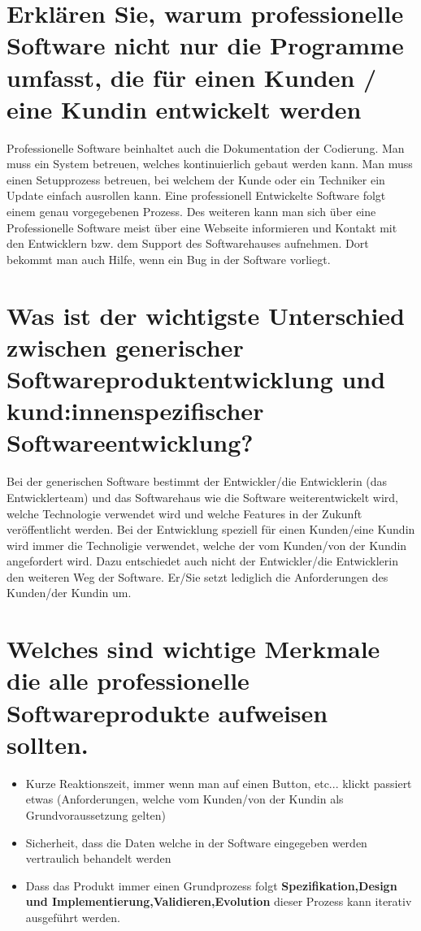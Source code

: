 \documentclass[12pt]{article}
\begin{document}
\section{Erklären Sie, warum professionelle Software nicht nur die Programme umfasst, die für einen Kunden / eine
Kundin entwickelt werden}
Professionelle Software beinhaltet auch die Dokumentation der Codierung. Man muss ein System betreuen, welches kontinuierlich gebaut werden kann. Man muss einen Setupprozess betreuen, bei welchem der Kunde oder ein Techniker ein Update einfach ausrollen kann. Eine professionell Entwickelte Software folgt einem genau vorgegebenen Prozess. Des weiteren kann man sich über eine Professionelle Software meist über eine Webseite informieren und Kontakt mit den Entwicklern bzw. dem Support des Softwarehauses aufnehmen. Dort bekommt man auch Hilfe, wenn ein Bug in der Software vorliegt.

\section{Was ist der wichtigste Unterschied zwischen generischer Softwareproduktentwicklung und
kund:innenspezifischer Softwareentwicklung?}
Bei der generischen Software bestimmt der Entwickler/die Entwicklerin (das Entwicklerteam) und das Softwarehaus wie die Software weiterentwickelt wird, welche Technologie verwendet wird und welche Features in der Zukunft veröffentlicht werden.
Bei der Entwicklung speziell für einen Kunden/eine Kundin wird immer die Technoligie verwendet, welche der vom Kunden/von der Kundin angefordert wird. Dazu entschiedet auch nicht der Entwickler/die Entwicklerin den weiteren Weg der Software. Er/Sie setzt lediglich die Anforderungen des Kunden/der Kundin um.

\section{Welches sind wichtige Merkmale die alle professionelle Softwareprodukte aufweisen sollten.}
\begin{itemize}
 \item Kurze Reaktionszeit, immer wenn man auf einen Button, etc... klickt passiert etwas (Anforderungen, welche vom Kunden/von der Kundin als Grundvoraussetzung gelten)
 \item Sicherheit, dass die Daten welche in der Software eingegeben werden vertraulich behandelt werden
 \item Dass das Produkt immer einen Grundprozess folgt \textbf{Spezifikation,Design und Implementierung,Validieren,Evolution} dieser Prozess kann iterativ ausgeführt werden.
\end{itemize}
\pagebreak
\end{document}

